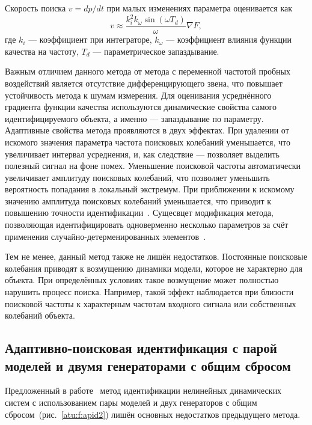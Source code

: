 Скорость поиска $v = dp / dt$ при малых изменениях параметра
оценивается как
%
\begin{equation}
\label{atu:eq:vasi}
  v
  \approx
  \frac{k_i^2 k_\omega \sin(\omega T_d) }{\omega} \nabla {F},
\end{equation}
%
где
$k_i$ --- коэффициент при интеграторе,
$k_\omega$ --- коэффициент влияния функции качества на частоту,
$T_d$ --- параметрическое запаздывание.

Важным отличием данного метода от метода с переменной частотой пробных воздействий является
отсутствие дифференцирующего звена, что повышает устойчивость метода к шумам измерения.
Для оценивания усреднённого градиента функции качества используются
динамические свойства самого идентифицируемого объекта, а именно --- запаздывание
по параметру. Адаптивные свойства метода
проявляются в двух эффектах.
При удалении от искомого значения параметра частота поисковых колебаний
уменьшается, что увеличивает интервал усреднения, и, как следствие ---
позволяет выделить полезный сигнал на фоне помех.
Уменьшение поисковой частоты автоматически увеличивает амплитуду поисковых колебаний,
что позволяет уменьшить вероятность попадания в локальный экстремум.
При приближении к искомому значению амплитуда поисковых колебаний уменьшается,
что приводит к повышению точности идентификации~\cite{mai_sear_meth_akt_id_ns,mai_syntez_adop_id,bodyan_adapt_viyavl}.
Сущесвцет модификация метода,
позволяющая идентифицировать одноверменно несколько параметров
за счёт применения случайно-детерменированных элементов~\cite{mich_92,mich_upr_prost_mech}.

Тем не менее, данный метод также не лишён недостатков.
Постоянные поисковые колебания приводят к возмущению динамики модели,
которое не характерно для объекта. При определённых условиях
такое возмущение может полностью нарушить процесс поиска.
Например, такой эффект наблюдается при близости поисковой частоты к характерным частотам входного сигнала или
собственных колебаний объекта.




\subsection{Адаптивно-поисковая идентификация с парой моделей и двумя генераторами с общим сбросом} %

Предложенный в работе~\cite{atu_phd_thesis} метод идентификации
нелинейных динамических систем с использованием
пары моделей и двух генераторов с общим сбросом~(рис.~\ref{atu:f:apid2})
лишён основных недостатков предыдущего метода.

